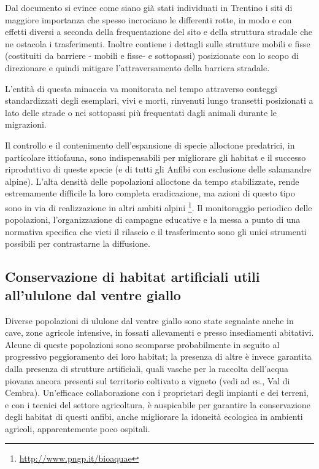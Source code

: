 \documentclass[10pt,twoside,openany,x11names,svgnames,italian,a5paper,dvipsnames,table]{memoir}
\begin{document}
Dal documento si evince come siano già stati individuati in Trentino i siti di maggiore importanza che spesso incrociano le differenti rotte, in modo e con effetti diversi a seconda della frequentazione del sito e della struttura stradale che ne ostacola i trasferimenti. Inoltre contiene i dettagli sulle strutture mobili e fisse (costituiti da barriere - mobili e fisse- e sottopassi) posizionate con lo scopo di direzionare e quindi mitigare l’attraversamento della barriera stradale.

L’entità di questa minaccia va monitorata nel tempo \cite{Pedrini14} attraverso conteggi standardizzati degli esemplari, vivi e morti, rinvenuti lungo transetti posizionati a lato delle strade o nei sottopassi più frequentati dagli animali durante le migrazioni.

Il controllo e il contenimento dell’espansione di specie alloctone predatrici, in particolare ittiofauna, sono indispensabili per migliorare gli habitat e il successo riproduttivo di queste specie (e di tutti gli Anfibi con esclusione delle salamandre alpine). L’alta densità delle popolazioni alloctone da tempo stabilizzate, rende estremamente difficile la loro completa eradicazione, ma azioni di questo tipo sono in via di realizzazione in altri ambiti alpini \footnote{\url{http://www.pngp.it/bioaquae}}. Il monitoraggio periodico delle popolazioni, l’organizzazione di campagne educative e la messa a punto di una normativa specifica che vieti il rilascio e il trasferimento sono gli unici strumenti possibili per contrastarne la diffusione.

\subsection{Conservazione di habitat artificiali utili all’ululone dal ventre giallo}
Diverse popolazioni di ululone dal ventre giallo sono state segnalate anche in cave, zone agricole 
intensive, in fossati allevamenti e presso insediamenti abitativi. Alcune di queste popolazioni sono scomparse probabilmente in seguito al progressivo peggioramento dei loro habitat; la presenza di altre è invece garantita dalla presenza di strutture artificiali, quali vasche per la raccolta dell’acqua piovana ancora presenti sul territorio coltivato a vigneto (vedi ad es.,  Val di Cembra). 
Un’efficace collaborazione con i proprietari degli impianti e dei terreni, e con i tecnici del settore agricoltura, è auspicabile  per garantire la conservazione degli habitat di questi anfibi, anche migliorare la idoneità ecologica in ambienti agricoli, apparentemente poco ospitali.
\end{document}
